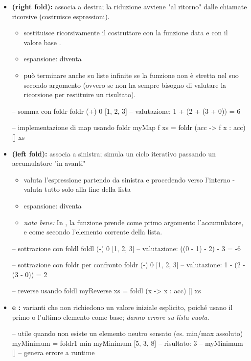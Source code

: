 \documentclass[a4paper,11pt]{report}
\begin{document}
\begin{itemize}
    \item \textbf{ (right fold):} associa a destra; la riduzione avviene "al ritorno" dalle chiamate ricorsive (costruisce espressioni). 
\begin{itemize}
    \item sostituisce ricorsivamente il costruttore \code{(:)} con la funzione  data e \code{[]} con il valore base .
        \item espansione:  diventa 
        \item può terminare anche su liste infinite se la funzione  non è stretta nel suo secondo argomento (ovvero se non ha sempre bisogno di valutare la ricorsione per restituire un risultato).
\end{itemize}
        \begin{haskellbox}{}
-- somma con foldr
foldr (+) 0 [1, 2, 3]
-- valutazione: 1 + (2 + (3 + 0)) = 6

-- implementazione di map usando foldr
myMap f xs = foldr (\x acc -> f x : acc) [] xs

\end{haskellbox}

    \item \textbf{ (left fold):} associa a sinistra; simula un ciclo iterativo passando un accumulatore "in avanti"
\begin{itemize}
    \item valuta l'espressione partendo da sinistra e procedendo verso l'interno - valuta tutto solo alla fine della lista
        \item espansione:  diventa 
        \item \textit{nota bene:} In , la funzione prende come primo argomento l'accumulatore, e come secondo l'elemento corrente della lista.
\end{itemize}
        \begin{haskellbox}{}
-- sottrazione con foldl
foldl (-) 0 [1, 2, 3]
-- valutazione: ((0 - 1) - 2) - 3 = -6

-- sottrazione con foldr per confronto
foldr (-) 0 [1, 2, 3]
-- valutazione: 1 - (2 - (3 - 0)) = 2

-- reverse usando foldl
myReverse xs = foldl (\acc x -> x : acc) [] xs
\end{haskellbox}

    \item \textbf{ e :} varianti che non richiedono un valore iniziale esplicito, poiché usano il primo o l'ultimo elemento come base; \textit{danno errore su lista vuota}.
\begin{haskellbox}{}
-- utile quando non esiste un elemento neutro sensato (es. min/max assoluto)
myMinimum = foldr1 min
myMinimum [5, 3, 8] -- risultato: 3
-- myMinimum []     -- genera errore a runtime
\end{haskellbox}{}
\end{itemize}
\end{document}

